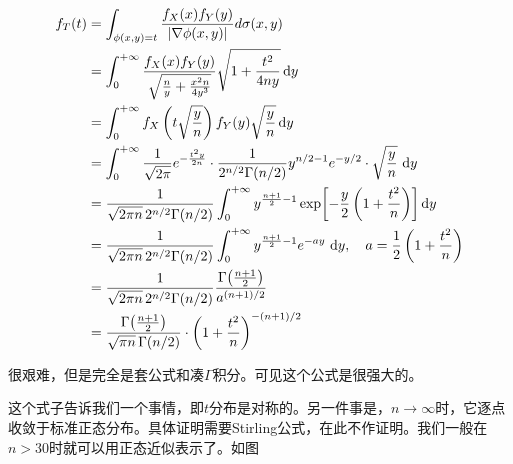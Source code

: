\begin{align*}
f_T(t) &= \int_{\phi(x,y)=t} \frac{f_X(x)f_Y(y)}{|\nabla\phi(x,y)|}d\sigma(x,y)\\
&= \int_{0}^{+\infty} \frac{f_X(x)f_Y(y)}{\sqrt{\frac{n}{y}+\frac{x^2n}{4y^3}}}\sqrt{1+\frac{t^2}{4ny}}\dif y\\
&= \int_{0}^{+\infty} f_X\left(t\sqrt{\frac{y}{n}}\right)f_Y(y)\sqrt{\frac{y}{n}}\dif y\\
&= \int_{0}^{+\infty}
     \frac{1}{\sqrt{2\pi}} e^{-\frac{t^2 y}{2n}}
     \cdot \frac{1}{2^{n/2}\Gamma(n/2)} y^{n/2-1} e^{-y/2}
     \cdot \sqrt{\frac{y}{n}}\, \dif y \\
&= \frac{1}{\sqrt{2\pi n}\, 2^{n/2}\Gamma(n/2)}
    \int_{0}^{+\infty} y^{\frac{n+1}{2}-1}
    \exp\!\left[-\frac{y}{2}\left(1+\frac{t^2}{n}\right)\right] \dif y\\
&= \frac{1}{\sqrt{2\pi n}\,2^{n/2}\Gamma(n/2)}\int_{0}^{+\infty} y^{\frac{n+1}{2}-1} e^{-a y}\, \dif y,
\quad a=\frac{1}{2}\left(1+\frac{t^2}{n}\right)\\
&= \frac{1}{\sqrt{2\pi n}\,2^{n/2}\Gamma(n/2)}
\frac{\Gamma\!\left(\frac{n+1}{2}\right)}{a^{(n+1)/2}}\\
&= \frac{\Gamma\!\left(\frac{n+1}{2}\right)}{\sqrt{\pi n}\,\Gamma(n/2)}
          \cdot \left(1+\frac{t^2}{n}\right)^{-(n+1)/2}
\end{align*}

很艰难，但是完全是套公式和凑$\Gamma$积分。可见这个公式是很强大的。

这个式子告诉我们一个事情，即$t$分布是对称的。另一件事是，$n\to\infty$时，它逐点收敛于标准正态分布。具体证明需要Stirling公式，在此不作证明。我们一般在$n>30$时就可以用正态近似表示了。如图

